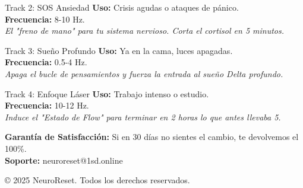 \documentclass[11pt,oneside]{article}
\begin{document}
\begin{neurocard}[colframe=neonpink]{Track 2: SOS Ansiedad}
    \textbf{\faBolt \hspace{0.1cm} Uso:} Crisis agudas o ataques de pánico. \\
    \textbf{Frecuencia:} 8-10 Hz. \\
    \textit{El "freno de mano" para tu sistema nervioso. Corta el cortisol en 5 minutos.}
\end{neurocard}

\begin{neurocard}[colframe=neonviolet]{Track 3: Sueño Profundo}
    \textbf{\faMoon \hspace{0.1cm} Uso:} Ya en la cama, luces apagadas. \\
    \textbf{Frecuencia:} 0.5-4 Hz. \\
    \textit{Apaga el bucle de pensamientos y fuerza la entrada al sueño Delta profundo.}
\end{neurocard}

\begin{neurocard}[colframe=neoncyan]{Track 4: Enfoque Láser}
    \textbf{\faBullseye \hspace{0.1cm} Uso:} Trabajo intenso o estudio. \\
    \textbf{Frecuencia:} 10-12 Hz. \\
    \textit{Induce el "Estado de Flow" para terminar en 2 horas lo que antes llevaba 5.}
\end{neurocard}

\vspace{1cm}

\begin{alertbox}
    \centering
    \faCheckCircle \hspace{0.1cm} \textbf{Garantía de Satisfacción:} Si en 30 días no sientes el cambio, te devolvemos el 100\%. \\
    \textbf{Soporte:} neuroreset@1sd.online
\end{alertbox}

\begin{center}
    \color{textgray!50} \scriptsize © 2025 NeuroReset. Todos los derechos reservados.
\end{center}
\end{document}

